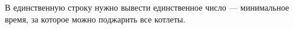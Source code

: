 В единственную строку нужно вывести единственное число --- минимальное время, за которое можно поджарить все котлеты.